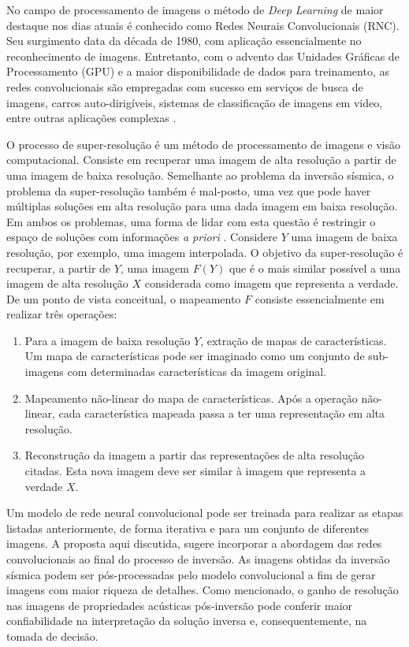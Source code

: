 No campo de
processamento de imagens o método de \textit{Deep Learning} de
maior destaque nos dias atuais é conhecido
como Redes Neurais Convolucionais (RNC). Seu surgimento
data da década de 1980, com aplicação essencialmente no reconhecimento de imagens.
Entretanto, com o advento das Unidades Gráficas de Processamento (GPU) e a maior
disponibilidade de dados para treinamento, as redes convolucionais
são empregadas com sucesso em serviços de busca de imagens, carros auto-dirigíveis,
sistemas de classificação de imagens em video, entre outras aplicações complexas \citep[p. 50]{Buduma15}.

O processo de super-resolução é um método de processamento de imagens e visão computacional.
Consiste em recuperar uma imagem de alta resolução a partir de uma imagem
de baixa resolução. Semelhante ao problema da inversão sísmica, o problema da super-resolução
também é mal-posto, uma vez que pode haver múltiplas soluções em alta resolução para uma dada imagem em baixa
resolução. Em ambos os problemas, uma forma de lidar com esta questão é restringir o espaço
de soluções com informações \textit{a priori} \citep{DongLoy14}. 
Considere $Y$ uma imagem de baixa resolução, por exemplo, uma
imagem interpolada. O objetivo da super-resolução é
recuperar, a partir de $Y$, uma imagem $F(Y)$ que é
o mais similar possível a uma imagem de alta resolução $X$
considerada como imagem que representa a verdade.
De um ponto de vista conceitual, o mapeamento $F$ consiste essencialmente em
realizar três operações:
\begin{enumerate}
 \item Para a imagem de baixa resolução $Y$, extração de mapas de características. Um mapa de características
 pode ser imaginado como um conjunto de sub-imagens com determinadas características da imagem original.
 \item Mapeamento não-linear do mapa de características. Após a operação não-linear, cada característica mapeada
 passa a ter uma representação em alta resolução.
 \item Reconstrução da imagem a partir das representações de alta resolução citadas. Esta nova imagem
 deve ser similar à imagem que representa a verdade $X$.
\end{enumerate}

Um modelo de rede neural convolucional pode ser treinada para realizar as etapas listadas anteriormente,
de forma iterativa e para um conjunto de diferentes imagens.
A proposta aqui discutida, sugere incorporar a abordagem das redes convolucionais ao final do processo de inversão.
As imagens obtidas da inversão sísmica podem ser pós-processadas pelo modelo convolucional
a fim de gerar imagens com maior riqueza de detalhes. Como mencionado, o ganho de resolução
nas imagens de propriedades acústicas pós-inversão pode conferir maior confiabilidade
na interpretação da solução inversa e, consequentemente, na tomada de decisão.


